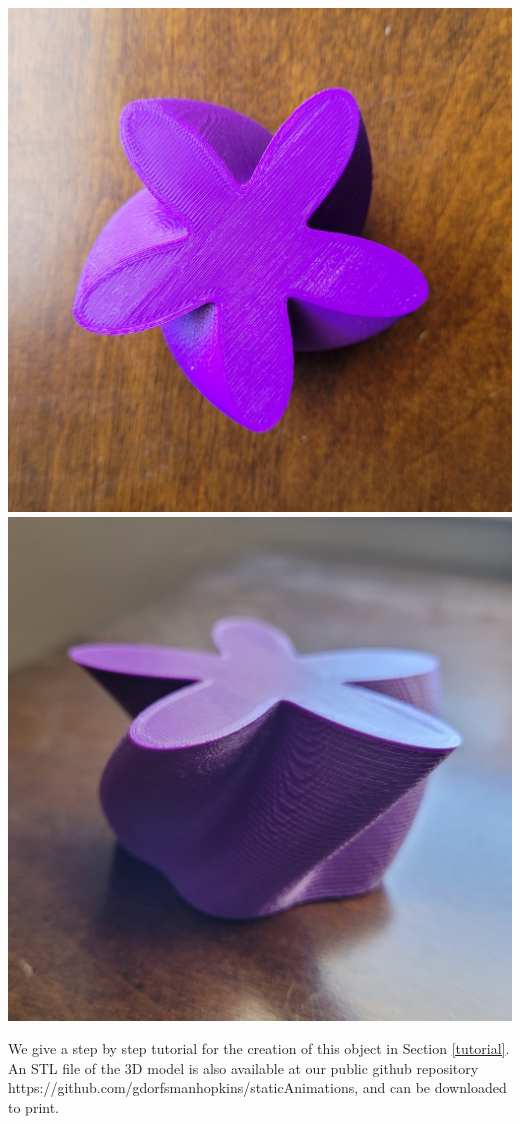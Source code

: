\documentclass[12 pt]{article}
\begin{document}
\begin{center}
    \includegraphics[width=.3\paperwidth]{images/flowerTop.jpg}\hspace{10pt}\includegraphics[width=.3\paperwidth]{images/flowerSide.jpg}
\end{center}
We give a step by step tutorial for the creation of this object in Section \ref{tutorial}.  An STL file of the 3D model is also available at our public github repository https://github.com/gdorfsmanhopkins/staticAnimations, and can be downloaded to print.\\
\end{document}
